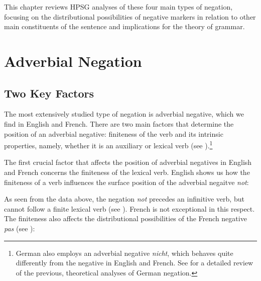 \documentclass[output=paper
                ,modfonts
		,nonflat
	        ,collection
	        ,collectionchapter
	        ,collectiontoclongg
 	        ,biblatex  
                ,babelshorthands
                ,newtxmath
                ,draftmode
                ,colorlinks, citecolor=brown 
]{./langsci/langscibook}
\begin{document}
{This chapter reviews HPSG analyses of these four main types of negation,
focusing on the distributional possibilities of negative markers in
relation to other main constituents of the sentence and implications for
the theory of grammar.






\section{Adverbial Negation}

\subsection{Two Key Factors}


The most extensively studied type of negation is adverbial negative, which
we find in English and French.
There are two main factors
that determine the position of an adverbial negative: finiteness of
the verb and its intrinsic properties, namely, whether it is an auxiliary
or lexical  verb (see \citep{Kim:00, KS:02}).\footnote{German also
employs an adverbial negative \emph{nicht}, which behaves quite
differently from the negative in English and French. See \citet{MuellerGT-Eng1}
for a detailed review of the previous, theoretical analyses of German negation.}


The first crucial factor that affects  the position of adverbial
negatives in English and French concerns the finiteness of the lexical  verb.
English shows us how the finiteness of a verb influences the
surface position of the adverbial negaitve \textit{not}:

\begin{exe}
\ex\label{eng-fin-neg} \begin{xlist}
\zl


\begin{exe}
\ex\label{fr-fin-neg} \begin{xlist}
\zl
%
\noindent As seen from the data above, the negation \textit{not} precedes an infinitive verb, but cannot follow
a finite lexical  verb  (see \citep{Baker:89,Baker:91,Ernst:92}).
French is not exceptional in this respect. The finiteness also affects the distributional possibilities of the French negative {\it pas} (see \citep{AG:97, KS:02, Zeijlstra:07}):


\end{xlist}
\end{exe}
\end{xlist}
\end{exe}}
\end{document}
